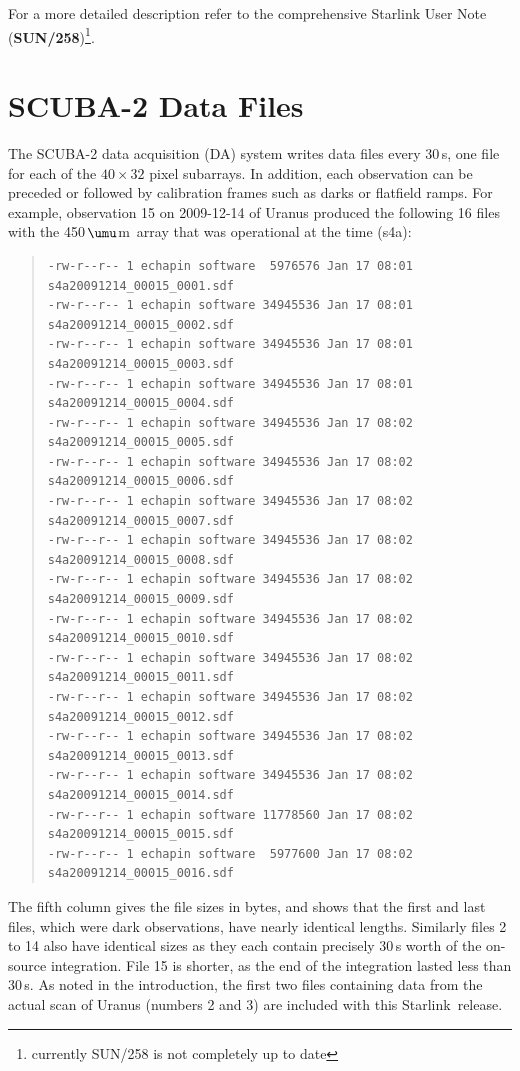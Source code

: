 \documentclass[twoside,11pt]{article}
\newcommand{\micron}{\mbox{\,${\umu}$m}}            %
\newcommand{\htmladdnormallink}[2]{#1}
\newcommand{\xref}[3]{#1}
\newcommand{\xlabel}[1]{}
\renewcommand{\_}{\texttt{\symbol{95}}}
\newenvironment{myquote}{\begin{quote}\begin{small}}{\end{small}\end{quote}}
\newcommand{\starlink}{\htmladdnormallink{Starlink}{http://starlink.jach.hawaii.edu}}
\newcommand{\smurfsun}{\xref{\textbf{SUN/258}}{sun258}{}}
\begin{document}
For a more detailed description refer to the comprehensive Starlink
User Note (\smurfsun)\footnote{currently SUN/258 is not completely up
  to date}.


\section{\xlabel{data_files}SCUBA-2 Data Files}
\label{sec:data}

The SCUBA-2 data acquisition (DA) system writes data files every
30\,s, one file for each of the $40\times32$ pixel subarrays. In
addition, each observation can be preceded or followed by calibration
frames such as darks or flatfield ramps. For example, observation 15
on 2009-12-14 of Uranus produced the following 16 files with the
450\micron\ array that was operational at the time (s4a):

\begin{myquote}
\begin{verbatim}
-rw-r--r-- 1 echapin software  5976576 Jan 17 08:01 s4a20091214_00015_0001.sdf
-rw-r--r-- 1 echapin software 34945536 Jan 17 08:01 s4a20091214_00015_0002.sdf
-rw-r--r-- 1 echapin software 34945536 Jan 17 08:01 s4a20091214_00015_0003.sdf
-rw-r--r-- 1 echapin software 34945536 Jan 17 08:01 s4a20091214_00015_0004.sdf
-rw-r--r-- 1 echapin software 34945536 Jan 17 08:02 s4a20091214_00015_0005.sdf
-rw-r--r-- 1 echapin software 34945536 Jan 17 08:02 s4a20091214_00015_0006.sdf
-rw-r--r-- 1 echapin software 34945536 Jan 17 08:02 s4a20091214_00015_0007.sdf
-rw-r--r-- 1 echapin software 34945536 Jan 17 08:02 s4a20091214_00015_0008.sdf
-rw-r--r-- 1 echapin software 34945536 Jan 17 08:02 s4a20091214_00015_0009.sdf
-rw-r--r-- 1 echapin software 34945536 Jan 17 08:02 s4a20091214_00015_0010.sdf
-rw-r--r-- 1 echapin software 34945536 Jan 17 08:02 s4a20091214_00015_0011.sdf
-rw-r--r-- 1 echapin software 34945536 Jan 17 08:02 s4a20091214_00015_0012.sdf
-rw-r--r-- 1 echapin software 34945536 Jan 17 08:02 s4a20091214_00015_0013.sdf
-rw-r--r-- 1 echapin software 34945536 Jan 17 08:02 s4a20091214_00015_0014.sdf
-rw-r--r-- 1 echapin software 11778560 Jan 17 08:02 s4a20091214_00015_0015.sdf
-rw-r--r-- 1 echapin software  5977600 Jan 17 08:02 s4a20091214_00015_0016.sdf
\end{verbatim}
\end{myquote}

The fifth column gives the file sizes in bytes, and shows that the
first and last files, which were dark observations, have nearly
identical lengths. Similarly files 2 to 14 also have identical sizes
as they each contain precisely 30\,s worth of the on-source
integration. File 15 is shorter, as the end of the integration lasted
less than 30\,s.  As noted in the introduction, the first two files
containing data from the actual scan of Uranus (numbers 2 and 3) are
included with this \starlink\ release.
\end{document}
